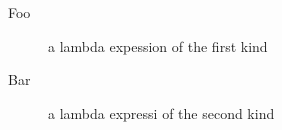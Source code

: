 \begin{description}
\item[Foo]a lambda expession of the first kind
\item[Bar]a lambda expressi of the second kind
\end{description}
